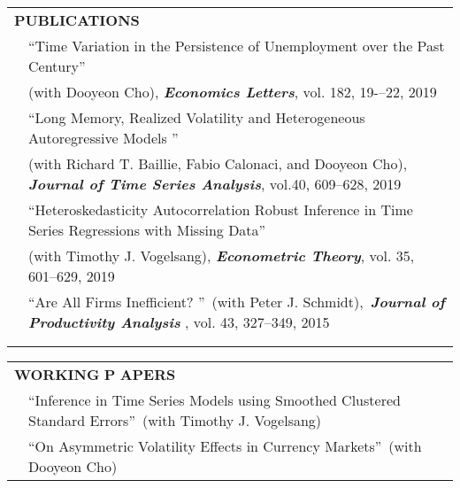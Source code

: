 \documentclass[10pt]{article}
\begin{document}
\begin{center}
\begin{tabular}{llllr}
\multicolumn{5}{l}{{\Large \textbf{P}}\textbf{UBLICATIONS}} \vspace{0.1cm}\\
& \multicolumn{4}{l}{\textquotedblleft Time Variation in the Persistence of Unemployment over the Past Century\textquotedblright}\\
 & \multicolumn{4}{l}{\hspace{0.2cm}(with Dooyeon Cho), {\bf\emph{Economics Letters}}, vol. 182, 19-–22, 2019}  \vspace{0.1cm}\\
& \multicolumn{4}{l}{\textquotedblleft  Long Memory, Realized Volatility and Heterogeneous Autoregressive Models \textquotedblright \ }\\
& \multicolumn{4}{l}{\hspace{0.2cm}(with Richard T. Baillie, Fabio Calonaci, and Dooyeon Cho),\, \emph{{\bf\emph {Journal of Time Series Analysis}}}, vol.40, 609--628, 2019  } \vspace{0.1cm}\\
 & \multicolumn{4}{l}{\textquotedblleft Heteroskedasticity Autocorrelation Robust Inference in Time Series Regressions with Missing Data\textquotedblright \ } \\
& \multicolumn{4}{l}{\hspace{0.2cm}(with Timothy J. Vogelsang), \emph{{\bf{\emph Econometric Theory}}}, vol. 35, 601--629, 2019}  \vspace{0.1cm}\\
& \multicolumn{4}{l}{\textquotedblleft Are All Firms Inefficient?
\textquotedblright \ (with Peter J. Schmidt),\, {\bf\emph{Journal of Productivity Analysis }}, vol. 43, 327--349, 2015 } \\
\multicolumn{5}{p{500pt}}{}\\\\
\end{tabular}
\begin{tabular}{llllr}
\multicolumn{5}{l}{{\Large \textbf{W}}\textbf{ORKING} {\Large \textbf{P}}%
\textbf{APERS}} \vspace{0.1cm}\\
& \multicolumn{4}{l}{\textquotedblleft Inference in Time Series Models using Smoothed Clustered Standard Errors\textquotedblright \ (with Timothy J. Vogelsang)} \vspace{0.1cm}\\
& \multicolumn{4}{l}{\textquotedblleft On Asymmetric Volatility Effects in Currency Markets\textquotedblright \ (with Dooyeon Cho)} \vspace{0.1cm}\\

\end{tabular}
\end{center}
\end{document}

